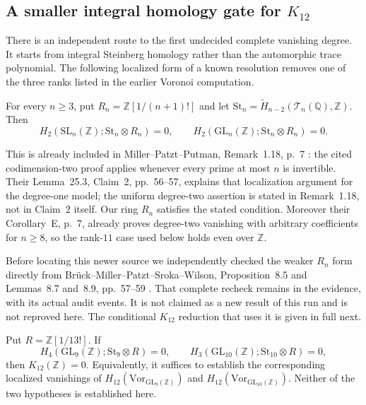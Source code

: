 \subsection{A smaller integral homology gate for \texorpdfstring{$K_{12}$}{K12}}

There is an independent route to the first undecided complete vanishing
degree. It starts from integral Steinberg homology rather than the
automorphic trace polynomial. The following localized form of a known
resolution removes one of the three ranks listed in the earlier
Voronoi computation.

\begin{sourcefact}[K17-ST2-LOCAL]\label{prop:steinberg-two-local}
For every $n\ge3$, put $R_n=\mathbb Z[1/(n+1)!]$ and let
$\mathrm{St}_n=\widetilde H_{n-2}(\mathcal T_n(\mathbb Q),\mathbb Z)$.
Then
\[
 H_2(\mathrm{SL}_n(\mathbb Z);\mathrm{St}_n\otimes R_n)=0,
 \qquad
 H_2(\mathrm{GL}_n(\mathbb Z);\mathrm{St}_n\otimes R_n)=0.
\]
\end{sourcefact}

This is already included in Miller--Patzt--Putman,
Remark~1.18, p.~7 \cite{MillerPatztPutman2025}: the cited
codimension-two proof applies whenever every prime at most $n$
is invertible. Their Lemma~25.3, Claim~2, pp.~56--57, explains
that localization argument for the degree-one model; the
uniform degree-two assertion is stated in Remark~1.18, not in
Claim~2 itself. Our ring $R_n$ satisfies the stated condition.
Moreover their Corollary~E, p.~7, already proves degree-two
vanishing with arbitrary coefficients for $n\ge8$, so the
rank-$11$ case used below holds even over $\mathbb Z$.

Before locating this newer source we independently checked the
weaker $R_n$ form directly from Br\"uck--Miller--Patzt--Sroka--Wilson,
Proposition~8.5 and Lemmas~8.7 and~8.9, pp.~57--59
\cite{BrueckEtAl2024}. That complete recheck remains in the
evidence, with its actual audit events. It is not claimed as a
new result of this run and is not reproved here. The conditional
$K_{12}$ reduction that uses it is given in full next.

\begin{proposition}\label{prop:k12-two-ranks}
Put $R=\mathbb Z[1/13!]$. If
\[
 H_4(\mathrm{GL}_9(\mathbb Z);\mathrm{St}_9\otimes R)=0,
 \qquad
 H_3(\mathrm{GL}_{10}(\mathbb Z);\mathrm{St}_{10}\otimes R)=0,
                                                               \tag{K23}
\]
then $K_{12}(\mathbb Z)=0$.
Equivalently, it suffices to establish the corresponding localized
vanishings of $H_{12}(\mathrm{Vor}_{\mathrm{GL}_9(\mathbb Z)})$
and $H_{12}(\mathrm{Vor}_{\mathrm{GL}_{10}(\mathbb Z)})$.
Neither of the two hypotheses is established here.
\end{proposition}

